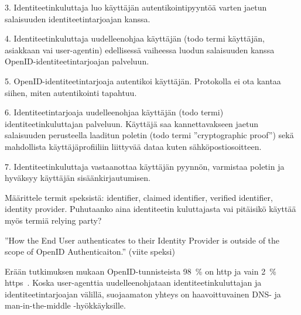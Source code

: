 \documentclass[finnish,gradu]{tktltiki}
\begin{document}
  3. Identiteetinkuluttaja luo käyttäjän autentikointipyyntöä varten jaetun salaisuuden identiteetintarjoajan kanssa.

  4. Identiteetinkuluttaja uudelleenohjaa käyttäjän (todo termi käyttäjän, asiakkaan vai user-agentin) edellisessä vaiheessa luodun salaisuuden kanssa OpenID-identiteetintarjoajan palveluun.

  5. OpenID-identiteetintarjoaja autentikoi käyttäjän. Protokolla ei ota kantaa siihen, miten autentikointi tapahtuu.

  6. Identiteetintarjoaja uudelleenohjaa käyttäjän (todo termi) identiteetinkuluttajan palveluun. Käyttäjä saa kannettavakseen jaetun salaisuuden perusteella laaditun poletin (todo termi ''cryptographic proof'') sekä mahdollista käyttäjäprofiiliin liittyvää dataa kuten sähköpostiosoitteen.

  7. Identiteetinkuluttaja vastaanottaa käyttäjän pyynnön, varmistaa poletin ja hyväksyy käyttäjän sisäänkirjautumisen.


  Määrittele termit speksistä: identifier, claimed identifier, verified identifier, identity provider.
  Puhutaanko aina identiteetin kuluttajasta vai pitäisikö käyttää myös termiä relying party?

  ''How the End User authenticates to their Identity Provider is outside of the scope of OpenID Authenticaiton.'' (viite speksi)

  Erään tutkimuksen mukaan OpenID-tunnisteista 98~\% on http ja vain 2~\% https~\cite{openid_identifier_survey_2011}.
  Koska user-agenttia uudelleenohjataan identiteetinkuluttajan ja identiteetintarjoajan välillä, suojaamaton yhteys on haavoittuvainen DNS- ja man-in-the-middle -hyökkäyksille.





\end{document}
